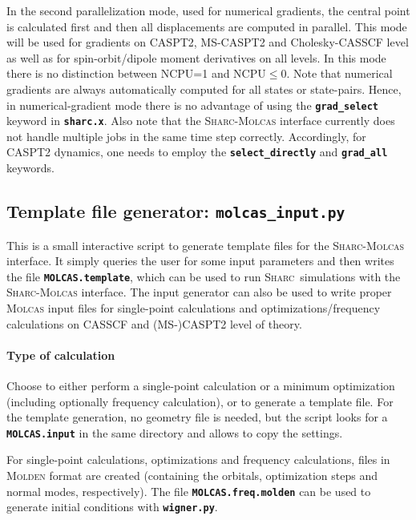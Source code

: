 \documentclass[a4paper,10pt,DIV=15,openany]{scrbook}
\newcommand{\sharc}{\textsc{Sharc}}
\newcommand{\ttt}[1]{\textbf{\texttt{#1}}}
\begin{document}
In the second parallelization mode, used for numerical gradients, the central point is calculated first and then all displacements are computed in parallel. This mode will be used for gradients on CASPT2, MS-CASPT2 and Cholesky-CASSCF level as well as for spin-orbit/dipole moment derivatives on all levels. In this mode there is no distinction between NCPU=1 and NCPU$\leq$0. Note that numerical gradients are always automatically computed for all states or state-pairs. Hence, in numerical-gradient mode there is no advantage of using the \ttt{grad\_select} keyword in \ttt{sharc.x}. Also note that the \sharc-\textsc{Molcas} interface currently does not handle multiple jobs in the same time step correctly. Accordingly, for CASPT2 dynamics, one needs to employ the \ttt{select\_directly} and \ttt{grad\_all} keywords.



\subsection{Template file generator: \ttt{molcas\_input.py}}\label{sec:molcas_input.py}

This is a small interactive script to generate template files for the \sharc-\textsc{Molcas} interface. It simply queries the user for some input parameters and then writes the file \ttt{MOLCAS.template}, which can be used to run \sharc\ simulations with the \sharc-\textsc{Molcas} interface.
The input generator can also be used to write proper \textsc{Molcas} input files for single-point calculations and optimizations/frequency calculations on CASSCF and (MS-)CASPT2 level of theory.

\paragraph{Type of calculation}

Choose to either perform a single-point calculation or a minimum optimization (including optionally frequency calculation), or to generate a template file. For the template generation, no geometry file is needed, but the script looks for a \ttt{MOLCAS.input} in the same directory and allows to copy the settings. 

For single-point calculations, optimizations and frequency calculations, files in \textsc{Molden} format are created (containing the orbitals, optimization steps and normal modes, respectively). The file \ttt{MOLCAS.freq.molden} can be used to generate initial conditions with \ttt{wigner.py}.
\end{document}
